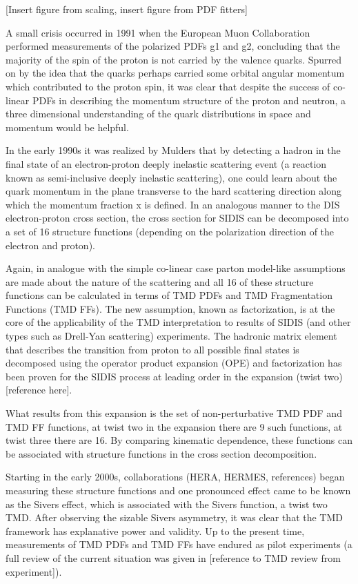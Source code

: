 [Insert figure from scaling, insert figure from PDF fitters]

A small crisis occurred in 1991 when the European Muon Collaboration performed measurements of the polarized PDFs g1 and g2, concluding that the majority of the spin of the proton is not carried by the valence quarks.  Spurred on by the idea that the quarks perhaps carried some orbital angular momentum which contributed to the proton spin, it was clear that despite the success of co-linear PDFs in describing the momentum structure of the proton and neutron, a three dimensional understanding of the quark distributions in space and momentum would be helpful.

In the early 1990s it was realized by Mulders that by detecting a hadron in the final state of an electron-proton deeply inelastic scattering event (a reaction known as semi-inclusive deeply inelastic scattering), one could learn about the quark momentum in the plane transverse to the hard scattering direction along which the momentum fraction x is defined.  In an analogous manner to the DIS electron-proton cross section, the cross section for SIDIS can be decomposed into a set of 16 structure functions (depending on the polarization direction of the electron and proton). 

Again, in analogue with the simple co-linear case parton model-like assumptions are made about the nature of the scattering and all 16 of these structure functions can be calculated in terms of TMD PDFs and TMD Fragmentation Functions (TMD FFs).  The new assumption, known as factorization, is at the core of the applicability of the TMD interpretation to results of SIDIS (and other types such as Drell-Yan scattering) experiments.  The hadronic matrix element that describes the transition from proton to all possible final states is decomposed using the operator product expansion (OPE) and factorization has been proven for the SIDIS process at leading order in the expansion (twist two) [reference here].

What results from this expansion is the set of non-perturbative TMD PDF and TMD FF functions, at twist two in the expansion there are 9 such functions, at twist three there are 16.  By comparing kinematic dependence, these functions can be associated with structure functions in the cross section decomposition.

Starting in the early 2000s, collaborations  (HERA, HERMES, references) began measuring these structure functions and one pronounced effect came to be known as the Sivers effect, which is associated with the Sivers function, a twist two TMD.  After observing the sizable Sivers asymmetry, it was clear that the TMD framework has explanative power and validity.  Up to the present time, measurements of TMD PDFs and TMD FFs have endured as pilot experiments (a full review of the current situation was given in [reference to TMD review from experiment]).

